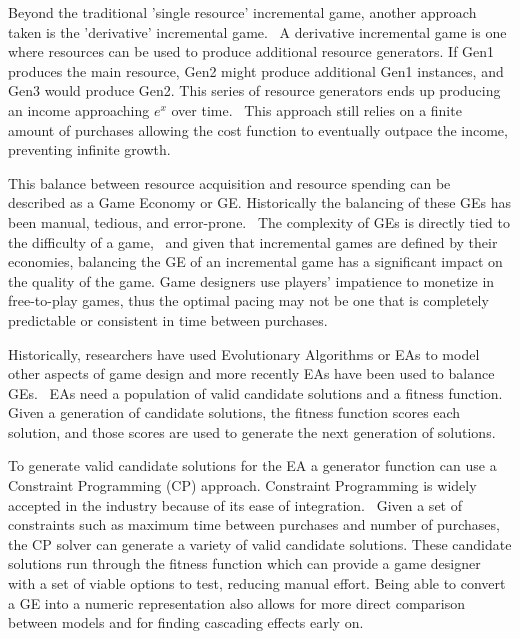 Beyond the traditional 'single resource' incremental game, another approach taken is the 'derivative' incremental game.~\cite{alharthi_playing_2018}
A derivative incremental game is one where resources can be used to produce additional resource generators.
If Gen1 produces the main resource, Gen2 might produce additional Gen1 instances, and Gen3 would produce Gen2.
This series of resource generators ends up producing an income approaching $e^x$ over time.~\cite{pecorella_math_2016}
This approach still relies on a finite amount of purchases allowing the cost function to eventually outpace the income, preventing infinite growth.

This balance between resource acquisition and resource spending can be described as a Game Economy or GE.
Historically the balancing of these GEs has been manual, tedious, and error-prone.~\cite{rogers_using_2023}
The complexity of GEs is directly tied to the difficulty of a game,~\cite{rogers_using_2023} and given that incremental games are defined by their economies, balancing the GE of an incremental game has a significant impact on the quality of the game.
Game designers use players' impatience to monetize in free-to-play games, thus the optimal pacing may not be one that is completely predictable or consistent in time between purchases.~\cite{rupp_geevo_2024}

Historically, researchers have used Evolutionary Algorithms or EAs to model other aspects of game design and more recently EAs have been used to balance GEs.~\cite{rogers_using_2023}
EAs need a population of valid candidate solutions and a fitness function.~\cite{rogers_using_2023}
Given a generation of candidate solutions, the fitness function scores each solution, and those scores are used to generate the next generation of solutions.~\cite{rogers_using_2023}

To generate valid candidate solutions for the EA a generator function can use a Constraint Programming (CP) approach.
Constraint Programming is widely accepted in the industry because of its ease of integration.~\cite{bordeaux_propositional_2006}
Given a set of constraints such as maximum time between purchases and number of purchases, the CP solver can generate a variety of valid candidate solutions.
These candidate solutions run through the fitness function which can provide a game designer with a set of viable options to test, reducing manual effort.
Being able to convert a GE into a numeric representation also allows for more direct comparison between models and for finding cascading effects early on.

